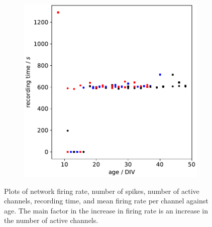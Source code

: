 \documentclass[10pt]{article}
\begin{document}
\begin{figure}
\begin{subfigure}[b]{0.45\textwidth}
	\centering
	\includegraphics[width=\textwidth]{../plots/development_plots_recording_time.pdf}
\end{subfigure}

	\caption{Plots of network firing rate, number of spikes, number of active channels, recording time, and mean firing rate per channel against age. The main factor in the increase in firing rate is an increase in the number of active channels.}
	\label{fig:development}
\end{figure}
\end{document}
